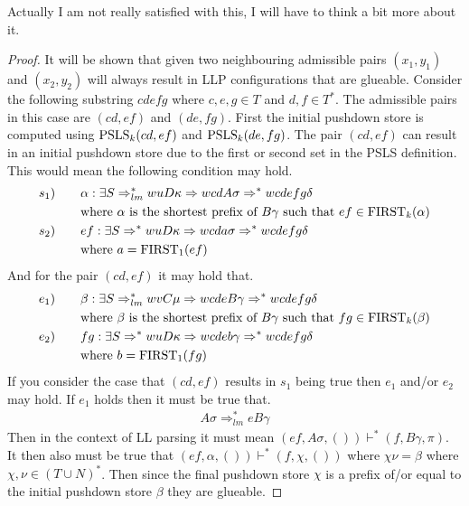 Actually I am not really satisfied with this, I will have to think a bit more about it.
\begin{proof}    
    It will be shown that given two neighbouring admissible pairs $(x_1, y_1)$ and $(x_2, y_2)$ will always result in LLP configurations that are glueable. Consider the following substring $cdefg$ where $c, e, g \in T$ and $d, f \in T^*$. The admissible pairs in this case are $(cd, ef)$ and $(de, fg)$. First the initial pushdown store is computed using $\text{PSLS}_k(cd, ef)$ and $\text{PSLS}_k(de, fg)$. The pair $(cd, ef)$ can result in an initial pushdown store due to the first or second set in the PSLS definition. This would mean the following condition may hold.
    \begin{align*}
        s_1) \qquad & \alpha : \exists S \Rightarrow^*_{lm} wuD\kappa \Rightarrow wcdA\sigma \Rightarrow^* wcdefg\delta \\
        & \text{where } \alpha \text{ is the shortest prefix of } B\gamma \text{ such that } ef \in \text{FIRST}_k(\alpha) \\
        s_2) \qquad & ef : \exists S \Rightarrow^* wuD\kappa \Rightarrow wcda\sigma \Rightarrow^* wcdefg\delta \\
        & \text{where } a = \text{FIRST}_1(ef)
    \end{align*}
    And for the pair $(cd, ef)$ it may hold that.
    \begin{align*}
        e_1) \qquad & \beta : \exists S \Rightarrow^*_{lm} wvC\mu \Rightarrow wcdeB\gamma \Rightarrow^* wcdefg\delta \\
        & \text{where } \beta \text{ is the shortest prefix of } B\gamma \text{ such that } fg \in \text{FIRST}_k(\beta) \\
        e_2) \qquad & fg : \exists S \Rightarrow^* wuD\kappa \Rightarrow wcdeb\gamma \Rightarrow^* wcdefg\delta \\
        & \text{where } b = \text{FIRST}_1(fg)
    \end{align*}
    If you consider the case that $(cd, ef)$ results in $s_1$ being true then $e_1$ and/or $e_2$ may hold. If $e_1$ holds then it must be true that.
    \begin{align*}
        A\sigma \Rightarrow^*_{lm} eB\gamma
    \end{align*}
    Then in the context of LL parsing it must mean $(ef, A\sigma, ()) \vdash^* (f, B\gamma, \pi)$. It then also must be true that $(ef, \alpha, ()) \vdash^* (f, \chi, ())$ where $\chi\nu = \beta$ where $\chi, \nu \in (T \cup N)^*$. Then since the final pushdown store $\chi$ is a prefix of/or equal to the initial pushdown store $\beta$ they are glueable.
    

\end{proof}
